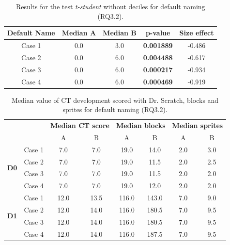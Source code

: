 \begin{table}
 \begin{center}
  \begin{tabular}{|c|c|c|c|c|}
    \hline
    \textbf{Default Name} & \textbf{Median A} & \textbf{Median B} & \textbf{p-value} & \textbf{Size effect} \\ \hline
    Case 1 & 0.0 & 3.0 & \textbf{0.001889} & -0.486 \\ \hline
    Case 2 & 0.0 & 6.0 & \textbf{0.004488} & -0.617 \\ \hline
    Case 3 & 0.0 & 6.0 & \textbf{0.000217} & -0.934 \\ \hline
    Case 4 & 0.0 & 6.0 & \textbf{0.000469} & -0.919 \\ \hline
  \end{tabular}
  \caption{Results for the test \textit{t-student} without deciles for default naming (RQ3.2).}
  \label{table:rq3_2_statistical_results}
 \end{center}
\end{table}


\begin{table}
 \begin{center}
  \begin{tabular}{|c|c|c|c|c|c|c|c|}
    \cline{3-8}
     \multicolumn{2}{c}{} & 
     \multicolumn{2}{|c|}{\textbf{Median CT score}} & \multicolumn{2}{|c|}{\textbf{Median blocks}} & \multicolumn{2}{|c|}{\textbf{Median sprites}} \\ \cline{3-8}
     \multicolumn{2}{c|}{} & 
     A & B & A & B & A & B \\ \hline
     \multirow{4}{*}{\textbf{D0}}
     & Case 1 & 7.0 & 7.0 & 19.0 & 14.0 & 2.0 & 3.0 \\
     & Case 2 & 7.0 & 7.0 & 19.0 & 11.5 & 2.0 & 2.5 \\
     & Case 3 & 7.0 & 7.0 & 19.0 & 11.5 & 2.0 & 2.0 \\
     & Case 4 & 7.0 & 7.0 & 19.0 & 12.0 & 2.0 & 2.0 \\ \hline
     \multirow{4}{*}{\textbf{D1}}
     & Case 1 & 12.0 & 13.5 & 116.0 & 143.0 & 7.0 & 9.0 \\
     & Case 2 & 12.0 & 14.0 & 116.0 & 180.5 & 7.0 & 9.5 \\
     & Case 3 & 12.0 & 14.0 & 116.0 & 180.5 & 7.0 & 9.5 \\
     & Case 4 & 12.0 & 14.0 & 116.0 & 187.5 & 7.0 & 9.5 \\ \hline
  \end{tabular}
  \caption{Median value of CT development scored with Dr. Scratch, blocks and sprites for default naming (RQ3.2).}
  \label{table:rq3_2_statistical_results_median}
 \end{center}
\end{table}


